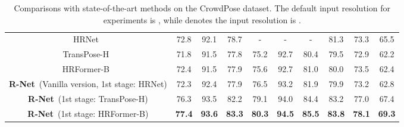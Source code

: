 \documentclass{article}
\begin{document}
\begin{table*}[h!]
{\begin{tabular}{cccccccccc}
\multicolumn{1}{c|}{HRNet~\cite{sun2019deep}}                & 72.8                     & 92.1                     & 78.7          & -             & -             & \multicolumn{1}{c}{-}    & \multicolumn{1}{c}{81.3} & \multicolumn{1}{c}{73.3} & \multicolumn{1}{c}{65.5} \\
\multicolumn{1}{c|}{TransPose-H~\cite{yang2021transpose}}            & 71.8                     & 91.5                     & 77.8          & 75.2          & 92.7          & \multicolumn{1}{c}{80.4} & \multicolumn{1}{c}{79.5} & \multicolumn{1}{c}{72.9} & \multicolumn{1}{c}{62.2} \\ 
\multicolumn{1}{c|}{HRFormer-B~\cite{YuanFHLZCW21}}            & 72.4                   & 91.5                    & 77.9        & 75.6          & 92.7          &  \multicolumn{1}{c}{81.0} & \multicolumn{1}{c}{80.0} & \multicolumn{1}{c}{73.5} & \multicolumn{1}{c}{62.4} \\ 
\hline

\multicolumn{1}{c|}{\textbf{R-Net}~(Vanilla version, 1st stage: HRNet)}            & 72.3                     & 92.4                     & 77.9          & 76.5          & 93.2          & \multicolumn{1}{c}{81.9} & \multicolumn{1}{c}{79.9} & \multicolumn{1}{c}{73.2} & \multicolumn{1}{c}{62.8} \\ 
\multicolumn{1}{c|}{\textbf{R-Net}~(1st stage: TransPose-H)} & 76.3 & 93.5 & 82.2 & 79.1 & 94.0 & \multicolumn{1}{c}{84.4} & \multicolumn{1}{c}{83.2} & \multicolumn{1}{c}{77.0} & \multicolumn{1}{c}{67.4} \\ 
\multicolumn{1}{c|}{\textbf{R-Net}~(1st stage: HRFormer-B)}            & \textbf{77.4}                   & \textbf{93.6}                    & \textbf{83.3}        & \textbf{80.3}          & \textbf{94.5}          & \multicolumn{1}{c}{\textbf{85.5}} & \multicolumn{1}{c}{\textbf{83.8}} & \multicolumn{1}{c}{\textbf{78.1}} & \multicolumn{1}{c}{\textbf{69.3}} \\ 

\bottomrule
\end{tabular}
}
\caption{\label{tab:CrowdPose_Res}Comparisons with state-of-the-art methods on the CrowdPose dataset. The default input resolution for experiments is , while  denotes the input resolution is .}
\end{table*}
\end{document}
